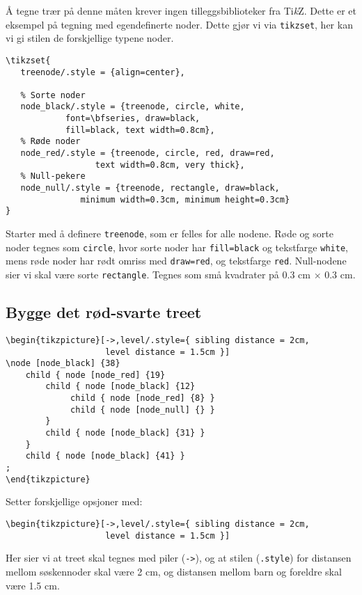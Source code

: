 \documentclass[11pt, a4paper]{article}
\newcommand{\TikZ}{Ti\textit{k}Z\xspace}
\begin{document}
Å tegne trær på denne måten krever ingen tilleggsbiblioteker fra \TikZ. Dette er et eksempel på tegning med egendefinerte noder. Dette gjør vi via \texttt{tikzset}, her kan vi gi stilen de forskjellige typene noder.
\begin{Verbatim}[fontsize=\small, frame=single]
\tikzset{
   treenode/.style = {align=center},
	
   % Sorte noder
   node_black/.style = {treenode, circle, white, 
			font=\bfseries, draw=black,
			fill=black, text width=0.8cm},
   % Røde noder
   node_red/.style = {treenode, circle, red, draw=red, 
	              text width=0.8cm, very thick},
   % Null-pekere
   node_null/.style = {treenode, rectangle, draw=black, 
		       minimum width=0.3cm, minimum height=0.3cm}
}
\end{Verbatim}
Starter med å definere \texttt{treenode}, som er felles for alle nodene. Røde og sorte noder tegnes som \texttt{circle}, hvor sorte noder har \texttt{fill=black} og tekstfarge \texttt{white}, mens røde noder har rødt omriss med \texttt{draw=red}, og tekstfarge \texttt{red}. Null-nodene sier vi skal være sorte \texttt{rectangle}. Tegnes som små kvadrater på 0.3 cm $\times$ 0.3 cm.

\newpage
\subsection{Bygge det rød-svarte treet}
\begin{Verbatim}[fontsize=\small, frame=single]
\begin{tikzpicture}[->,level/.style={ sibling distance = 2cm, 
                    level distance = 1.5cm }] 
\node [node_black] {38}
    child { node [node_red] {19} 
        child { node [node_black] {12}
             child { node [node_red] {8} }
             child { node [node_null] {} }
        }
        child { node [node_black] {31} }
    }
    child { node [node_black] {41} }
; 
\end{tikzpicture}
\end{Verbatim}

Setter forskjellige opsjoner med:
\begin{Verbatim}[fontsize=\small, frame=single]
\begin{tikzpicture}[->,level/.style={ sibling distance = 2cm, 
                    level distance = 1.5cm }]
\end{Verbatim}
Her sier vi at treet skal tegnes med piler (\texttt{->}), og at stilen (\texttt{.style}) for distansen mellom søskennoder skal være 2 cm, og distansen mellom barn og foreldre skal være 1.5 cm.
\end{document}
